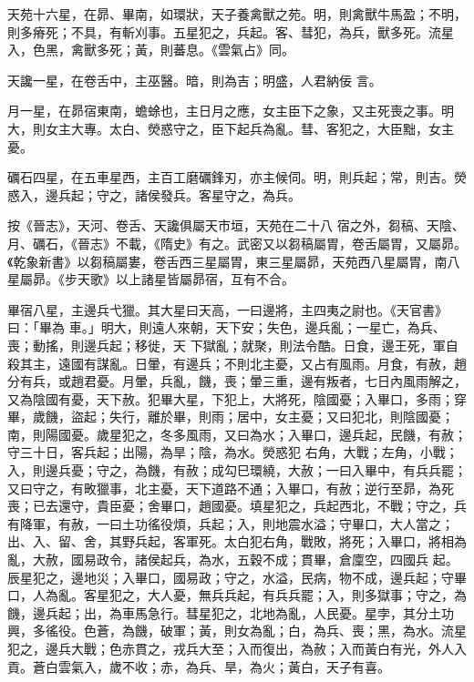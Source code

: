 \begin{pinyinscope}
 天苑十六星，在昴、畢南，如環狀，天子養禽獸之苑。明，則禽獸牛馬盈；不明，則多瘠死；不具，有斬刈事。五星犯之，兵起。客、彗犯，為兵，獸多死。流星入，色黑，禽獸多死；黃，則蕃息。《雲氣占》同。



 天讒一星，在卷舌中，主巫醫。暗，則為吉；明盛，人君納佞
 言。



 月一星，在昴宿東南，蟾蜍也，主日月之應，女主臣下之象，又主死喪之事。明大，則女主大專。太白、熒惑守之，臣下起兵為亂。彗、客犯之，大臣黜，女主憂。



 礪石四星，在五車星西，主百工磨礪鋒刃，亦主候伺。明，則兵起；常，則吉。熒惑入，邊兵起；守之，諸侯發兵。客星守之，為兵。



 按《晉志》，天河、卷舌、天讒俱屬天市垣，天苑在二十八
 宿之外，芻稿、天陰、月、礪石，《晉志》不載，《隋史》有之。武密又以芻稿屬胃，卷舌屬胃，又屬昴。《乾象新書》以芻稿屬婁，卷舌西三星屬胃，東三星屬昴，天苑西八星屬胃，南八星屬昴。《步天歌》以上諸星皆屬昴宿，互有不合。


畢宿八星，主邊兵弋獵。其大星曰天高，一曰邊將，主四夷之尉也。《天官書》曰：「畢為
 車。」明大，則遠人來朝，天下安；失色，邊兵亂；一星亡，為兵、喪；動搖，則邊兵起；移徙，天
 下獄亂；就聚，則法令酷。日食，邊王死，軍自殺其主，遠國有謀亂。日暈，有邊兵；不則北主憂，又占有風雨。月食，有赦，趙分有兵，或趙君憂。月暈，兵亂，饑，喪；暈三重，邊有叛者，七日內風雨解之，又為陰國有憂，天下赦。犯畢大星，下犯上，大將死，陰國憂；入畢口，多雨；穿畢，歲饑，盜起；失行，離於畢，則雨；居中，女主憂；又曰犯北，則陰國憂；南，則陽國憂。歲星犯之，冬多風雨，又曰為水；入畢口，邊兵起，民饑，有赦；守三十日，客兵起；出陽，為旱；陰，為水。熒惑犯
 右角，大戰；左角，小戰；入，則邊兵憂；守之，為饑，有赦；成勾巳環繞，大赦；一曰入畢中，有兵兵罷；又曰守之，有畋獵事，北主憂，天下道路不通；入畢口，有赦；逆行至昴，為死喪；已去還守，貴臣憂；舍畢口，趙國憂。填星犯之，兵起西北，不戰；守之，兵有降軍，有赦，一曰土功徭役煩，兵起；入，則地震水溢；守畢口，大人當之；出、入、留、舍，其野兵起，客軍死。太白犯右角，戰敗，將死；入畢口，將相為亂，大赦，國易政令，諸侯起兵，為水，五穀不成；貫畢，倉廩空，四國兵
 起。辰星犯之，邊地災；入畢口，國易政；守之，水溢，民病，物不成，邊兵起；守畢口，人為亂。客星犯之，大人憂，無兵兵起，有兵兵罷；入，則多獄事；守之，為饑，邊兵起；出，為車馬急行。彗星犯之，北地為亂，人民憂。星孛，其分土功興，多徭役。色蒼，為饑，破軍；黃，則女為亂；白，為兵、喪；黑，為水。流星犯之，邊兵大戰；色赤貫之，戎兵大至；入而復出，為赦；入而黃白有光，外人入貢。蒼白雲氣入，歲不收；赤，為兵、旱，為火；黃白，天子有喜。




\end{pinyinscope}

